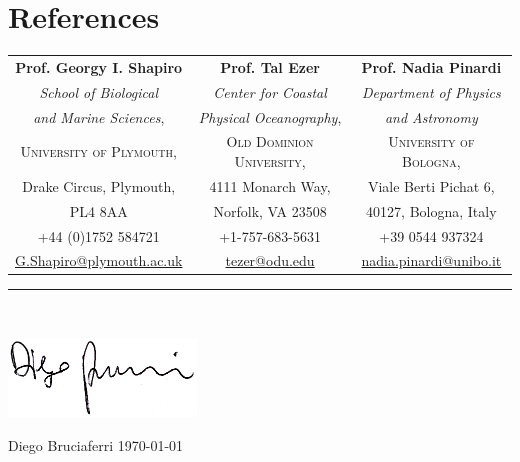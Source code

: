 \documentclass[a4paper, oneside, final]{scrartcl}
\begin{document}
\section{References}
\bigskip
\noindent
\begin{tabularx}{0.97\linewidth}{c|c|c}

\textbf{Prof. Georgy I. Shapiro}      & \textbf{Prof. Tal Ezer}            & \textbf{Prof. Nadia Pinardi}\\
\textit{School of Biological}         & \textit{Center for Coastal}        & \textit{Department of Physics} \\
\textit{and Marine Sciences},         & \textit{Physical Oceanography},    & \textit{and Astronomy} \\
\textsc{University of Plymouth},      & \textsc{Old Dominion University},  & \textsc{University of Bologna},\\
Drake Circus, Plymouth,               & 4111 Monarch Way,                  & Viale Berti Pichat 6, \\ 
PL4 8AA                               & Norfolk, VA 23508                  & 40127, Bologna, Italy \\
+44 (0)1752 584721                    & +1-757-683-5631                    & +39 0544 937324 \\
\href{mailto:G.Shapiro@plymouth.ac.uk}{G.Shapiro@plymouth.ac.uk} & \href{mailto:tezer@odu.edu}{tezer@odu.edu} & \href{mailto:nadia.pinardi@unibo.it}{nadia.pinardi@unibo.it}\\

\end{tabularx}

\begin{center}
\noindent\rule{16.2cm}{1pt}\\
\end{center}
\bigskip

\begin{flushleft}
\includegraphics[width=5cm]{./firma_Diego.png}\\
\end{flushleft}

Diego Bruciaferri \hspace{8cm} \today
\end{document}
